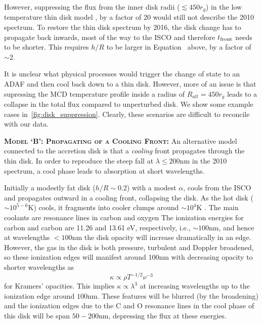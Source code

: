 \documentclass[11pt,a4paper]{article}
\begin{document}
However, suppressing the flux from the inner disk radii ($\lesssim 450 r_{g}$)
in the low temperature thin disk model \citep{Narayan1997, Gammie1999,
Agol_Krolik2000, Afshordi_Paczynski2003, Ford2018}, by a factor of
$20$ would still not describe the 2010 spectrum. To restore the thin disk
spectrum by 2016, the disk change has to propagate back inwards, most
of the way to the ISCO and therefore $t_{\rm front}$ needs to be
shorter. This requires $h/R$ to be larger in
Equation~\label{eqn:t_front} above, by a factor of $\sim 2$.

It is unclear what physical processes would trigger the change of
state to an ADAF and then cool back down to a thin disk. However, more
of an issue is that supressing the MCD temperature profile inside a
radius of $R_{alt} = 450 r_{g}$ leads to a collapse in the total
flux compared to unperturbed disk. We show some example cases
in~\ref{fig:disk_suppression}. Clearly, these scenarios are difficult
to reconcile with our data.

\smallskip \smallskip
\noindent
\textbf{\textsc{Model `B': Propagating of a Cooling Front: }}
An alternative model connected to the accretion disk is that a
\emph{cooling} front propagates through the thin disk.  In order to
reproduce the steep fall at $\lambda \leq 200$nm in the 2010 spectrum,
a cool phase leads to absorption at short wavelengths.

Initially a modestly fat disk ($h/R \sim 0.2$) with a modest $\alpha$,
cools from the ISCO and propagates outward in a cooling front,
collapsing the disk. As the hot disk ($\sim 10^{5-6}$K) cools, it
fragments into cooler clumps around $\sim 10^{4}$K \citep[see e.g.,
][]{McCourt2016}.  The main coolants are resonance lines in carbon and
oxygen \citep[see e.g., Fig. 18 in ][]{Sutherland_Dopita1993} The
ionization energies for carbon and carbon are 11.26 and 13.61 eV,
respectively, i.e., $\sim 100$nm, and hence at wavelengths $<100$nm
the disk opacity will increase dramatically in an edge. %
However, the
gas in the disk is both pressure, turbulent and Doppler broadened, so
these ionization edges will manifest around 100nm with decreasing
opacity to shorter wavelengths as
\begin{equation}
  \kappa \propto \rho T^{-1/2} \nu^{-3}
\end{equation}
for Kramers' opacities. This implies $\kappa \propto \lambda^{3}$
at increasing wavelengths up to the ionization edge around $100$nm.
These features will be blurred (by the broadening) and the ionization
edges due to the C and O resonance lines in the cool phase of this
disk will be span $50-200$nm, depressing the flux at these energies.
\end{document}

